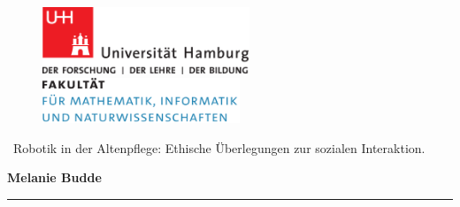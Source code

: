 \begin{titlepage}

  \setcounter{page}{-1}

	\begin{figure}[h]
		\begin{minipage}[b]{62mm}
			\includegraphics[width=62mm]{images/unilogo}
		\end{minipage}
		\hspace{4cm}
		\begin{minipage}[b]{59mm}
			\includegraphics[width=59mm]{images/minlogo}
		\end{minipage}
	\end{figure}

	\vfill
	
	\begin{center}
		
		\vspace{14mm}
		\noindent \huge{\
		  Robotik in der Altenpflege: Ethische Überlegungen zur sozialen Interaktion.
		}
		\vspace{60mm}	
	\end{center}
	
	\vfill
	
	\noindent \textbf{Melanie Budde} \\
	\noindent \rule{\textwidth}{0.4mm} 
	 \\
	 \\
	 \\


	 \\
	

\end{titlepage}
